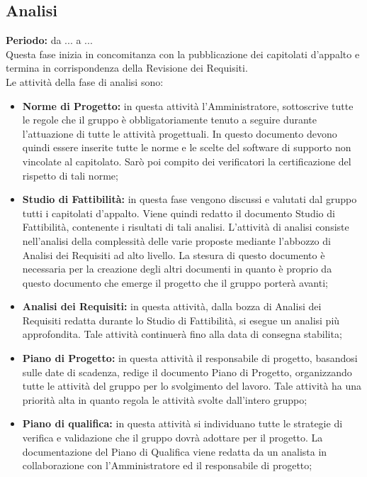 \subsection{Analisi}
	\textbf{Periodo:} da ... a ... \\
	Questa fase inizia in concomitanza con la pubblicazione dei capitolati d'appalto e termina in 			corrispondenza della Revisione dei Requisiti. \\
	Le attività della fase di analisi sono: \\
	\begin{itemize}
		\item \textbf{Norme di Progetto:} in questa attività l'Amministratore, sottoscrive tutte le regole che il gruppo è obbligatoriamente tenuto a seguire durante l'attuazione di tutte le attività progettuali. In questo documento devono quindi essere inserite tutte le norme e le scelte del software di supporto non vincolate al capitolato. Sarò poi compito dei verificatori la certificazione del rispetto di tali norme; \\
		\item \textbf{Studio di Fattibilità:} in questa fase vengono discussi e valutati dal gruppo tutti i capitolati d'appalto. Viene quindi redatto il documento Studio di Fattibilità, contenente i risultati di tali analisi. L'attività di analisi consiste nell'analisi della complessità delle varie proposte mediante l'abbozzo di Analisi dei Requisiti ad alto livello. La stesura di questo documento è necessaria per la creazione degli altri documenti in quanto è proprio da questo documento che emerge il progetto che il gruppo porterà avanti; \\
		\item \textbf{Analisi dei Requisiti:} in questa attività, dalla bozza di Analisi dei Requisiti redatta durante lo Studio di Fattibilità, si esegue un analisi più approfondita. Tale attività continuerà fino alla data di consegna stabilita; \\
		\item \textbf{Piano di Progetto:} in questa attività il responsabile di progetto, basandosi sulle date di scadenza, redige il documento Piano di Progetto, organizzando tutte le attività del gruppo per lo svolgimento del lavoro. Tale attività ha una priorità alta in quanto regola le attività svolte dall'intero gruppo; \\
		\item \textbf{Piano di qualifica:} in questa attività si individuano tutte le strategie di verifica e validazione che il gruppo dovrà adottare per il progetto. La documentazione del Piano di Qualifica viene redatta da un analista in collaborazione con l'Amministratore ed il responsabile di progetto; \\

\end{itemize}
